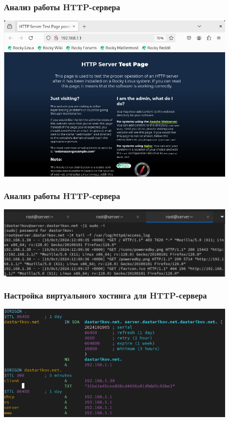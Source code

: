 \begin{frame}
\frametitle{Анализ работы HTTP-сервера}
    \includegraphics[width=0.9\textwidth]{../images/image03.png}
\end{frame}
 

\begin{frame}
\frametitle{Анализ работы HTTP-сервера}
    \includegraphics[width=0.9\textwidth]{../images/image14.png}
\end{frame}
 

\begin{frame}
\frametitle{Настройка виртуального хостинга для HTTP-сервера}
    \includegraphics[width=0.9\textwidth]{../images/image05.png}
\end{frame}
 

